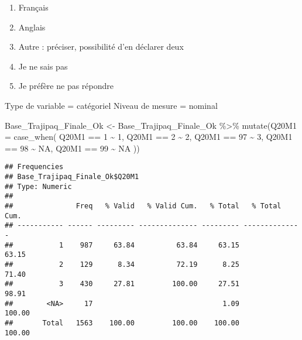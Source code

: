 \documentclass[
]{article}
\newenvironment{Shaded}{\begin{snugshade}}{\end{snugshade}}
\newcommand{\AttributeTok}[1]{\textcolor[rgb]{0.77,0.63,0.00}{#1}}
\newcommand{\ConstantTok}[1]{\textcolor[rgb]{0.00,0.00,0.00}{#1}}
\newcommand{\DecValTok}[1]{\textcolor[rgb]{0.00,0.00,0.81}{#1}}
\newcommand{\FunctionTok}[1]{\textcolor[rgb]{0.00,0.00,0.00}{#1}}
\newcommand{\NormalTok}[1]{#1}
\newcommand{\OtherTok}[1]{\textcolor[rgb]{0.56,0.35,0.01}{#1}}
\newcommand{\SpecialCharTok}[1]{\textcolor[rgb]{0.00,0.00,0.00}{#1}}
\providecommand{\tightlist}{%
  \setlength{\itemsep}{0pt}\setlength{\parskip}{0pt}}
\begin{document}
\begin{enumerate}
\def\labelenumi{\arabic{enumi}.}
\tightlist
\item
  Français
\item
  Anglais
\item
  Autre : préciser, possibilité d'en déclarer deux
\item
  Je ne sais pas
\item
  Je préfère ne pas répondre
\end{enumerate}

Type de variable = catégoriel Niveau de mesure = nominal

\begin{Shaded}
\begin{Highlighting}[]
\NormalTok{Base\_Trajipaq\_Finale\_Ok }\OtherTok{\textless{}{-}}
\NormalTok{  Base\_Trajipaq\_Finale\_Ok }\SpecialCharTok{\%\textgreater{}\%}
  \FunctionTok{mutate}\NormalTok{(}\AttributeTok{Q20M1 =} \FunctionTok{case\_when}\NormalTok{(}
\NormalTok{    Q20M1 }\SpecialCharTok{==} \DecValTok{1} \SpecialCharTok{\textasciitilde{}} \DecValTok{1}\NormalTok{,}
\NormalTok{    Q20M1 }\SpecialCharTok{==} \DecValTok{2} \SpecialCharTok{\textasciitilde{}} \DecValTok{2}\NormalTok{,}
\NormalTok{    Q20M1 }\SpecialCharTok{==} \DecValTok{97} \SpecialCharTok{\textasciitilde{}} \DecValTok{3}\NormalTok{,}
\NormalTok{    Q20M1 }\SpecialCharTok{==} \DecValTok{98} \SpecialCharTok{\textasciitilde{}} \ConstantTok{NA}\NormalTok{,}
\NormalTok{    Q20M1 }\SpecialCharTok{==} \DecValTok{99} \SpecialCharTok{\textasciitilde{}} \ConstantTok{NA}
\NormalTok{  ))}
\end{Highlighting}
\end{Shaded}

\begin{Shaded}
\end{Shaded}

\begin{verbatim}
## Frequencies  
## Base_Trajipaq_Finale_Ok$Q20M1  
## Type: Numeric  
## 
##               Freq   % Valid   % Valid Cum.   % Total   % Total Cum.
## ----------- ------ --------- -------------- --------- --------------
##           1    987     63.84          63.84     63.15          63.15
##           2    129      8.34          72.19      8.25          71.40
##           3    430     27.81         100.00     27.51          98.91
##        <NA>     17                               1.09         100.00
##       Total   1563    100.00         100.00    100.00         100.00
\end{verbatim}
\end{document}
